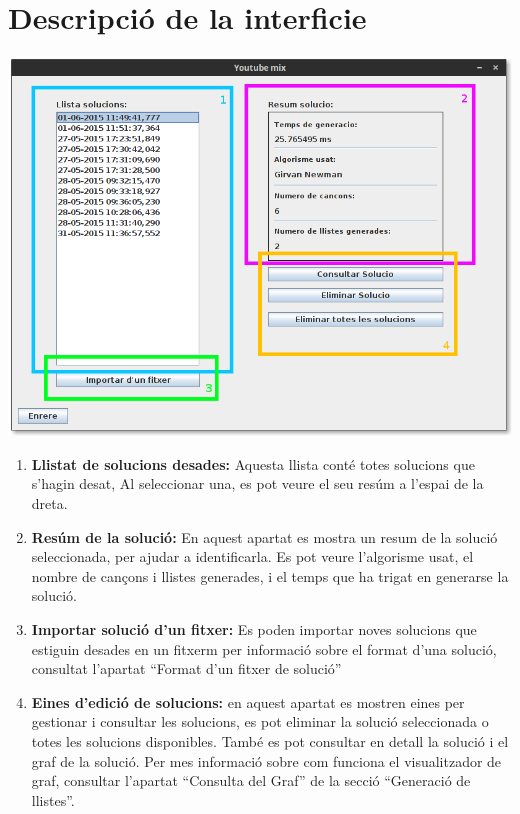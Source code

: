 \documentclass[a4paper,10pt,oneside]{sphinxmanual}
\begin{document}
\section{Descripció de la interficie}
\label{consult_hist:descripcio-de-la-interficie}
\includegraphics{consult_sol.png}
\begin{enumerate}
\item {} 
\textbf{Llistat de solucions desades:} Aquesta llista conté totes solucions que s'hagin desat, Al seleccionar una, es pot veure el seu resúm a l'espai de la dreta.

\item {} 
\textbf{Resúm de la solució:} En aquest apartat es mostra un resum de la solució seleccionada, per ajudar a identificarla. Es pot veure l'algorisme usat, el nombre de cançons i llistes generades, i el temps que ha trigat en generarse la solució.

\item {} 
\textbf{Importar solució d'un fitxer:} Es poden importar noves solucions que estiguin desades en un fitxerm per informació sobre el format d'una solució, consultat l'apartat ``Format d'un fitxer de solució''

\item {} 
\textbf{Eines d'edició de solucions:} en aquest apartat es mostren eines per gestionar i consultar les solucions, es pot eliminar la solució seleccionada o totes les solucions disponibles. També es pot consultar en detall la solució i el graf de la solució. Per mes informació sobre com funciona el visualitzador de graf, consultar l'apartat ``Consulta del Graf'' de la secció ``Generació de llistes''.

\end{enumerate}
\end{document}

